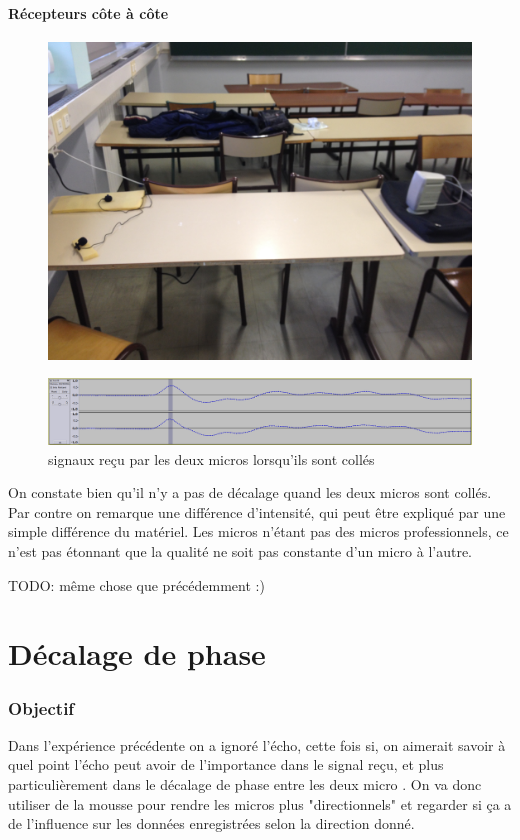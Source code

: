 \documentclass[12pt,a4paper]{article}
\begin{document}
\subsection{Récepteurs côte à côte}
\begin{figure}[H]
\includegraphics[width=\textwidth]{../donnees25-02/IMG_0920.jpg} 
\end{figure}

\begin{figure}[H]
\includegraphics[width=\textwidth]{../donnees25-02/mesures_micro_colles/colles.png} 
\caption{signaux reçu par les deux micros lorsqu'ils sont collés}
\end{figure}
On constate bien qu'il n'y a pas de décalage quand les deux micros sont collés. Par contre on remarque une différence d'intensité, qui peut être expliqué par une simple différence du matériel. Les micros n'étant pas des micros professionnels, ce n'est pas étonnant que la qualité ne soit pas constante d'un micro à l'autre.


TODO: même chose que précédemment :)


\part{Décalage de phase}
\section{Objectif}
Dans l'expérience précédente on a ignoré l'écho, cette fois si, on aimerait savoir à quel point l'écho peut avoir de l'importance dans le signal reçu, et plus particulièrement dans le décalage de phase entre les deux micro .
On va donc utiliser de la mousse pour rendre les micros plus "directionnels" et regarder si ça a de l'influence sur les données enregistrées selon la direction donné.
\end{document}
